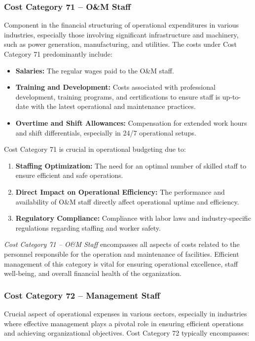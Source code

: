 \subsubsection*{Cost Category 71 – O\&M Staff}
Component in the financial structuring of operational expenditures in various industries, especially those involving significant infrastructure and machinery, such as power generation, manufacturing, and utilities.  The costs under Cost Category 71 predominantly include:

\begin{itemize}
    \item \textbf{Salaries:} The regular wages paid to the O\&M staff.
    \item \textbf{Training and Development:} Costs associated with professional development, training programs, and certifications to ensure staff is up-to-date with the latest operational and maintenance practices.
    \item \textbf{Overtime and Shift Allowances:} Compensation for extended work hours and shift differentials, especially in 24/7 operational setups.
\end{itemize}

Cost Category 71 is crucial in operational budgeting due to:

\begin{enumerate}
    \item \textbf{Staffing Optimization:} The need for an optimal number of skilled staff to ensure efficient and safe operations.
    \item \textbf{Direct Impact on Operational Efficiency:} The performance and availability of O\&M staff directly affect operational uptime and efficiency.
    \item \textbf{Regulatory Compliance:} Compliance with labor laws and industry-specific regulations regarding staffing and worker safety.
\end{enumerate}

\textit{Cost Category 71 – O\&M Staff} encompasses all aspects of costs related to the personnel responsible for the operation and maintenance of facilities. Efficient management of this category is vital for ensuring operational excellence, staff well-being, and overall financial health of the organization.


\subsubsection*{Cost Category 72 – Management Staff}
Crucial aspect of operational expenses in various sectors, especially in industries where effective management plays a pivotal role in ensuring efficient operations and achieving organizational objectives.  Cost Category 72 typically encompasses:

